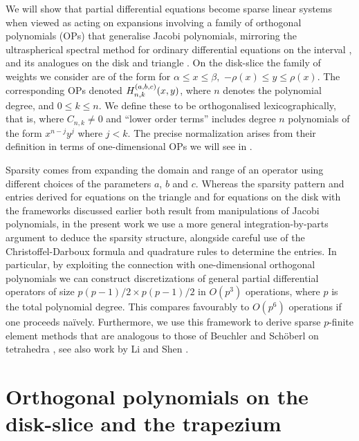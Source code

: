 We will show that partial differential equations become sparse linear systems when viewed as acting on expansions involving a family of orthogonal polynomials (OPs) that generalise Jacobi polynomials, mirroring the ultraspherical spectral method for ordinary differential equations on the interval \cite{olver2013fast}, and its analogues on the disk \cite{vasil2016tensor} and triangle \cite{olver2018recurrence,olver2019triangle}. On the disk-slice the family of weights we consider are of the form 
for $\alpha \leq x \leq \beta,$ $-\rho(x) \leq y \leq \rho(x)$. The corresponding OPs denoted $H_{n,k}^{(a,b,c)}(x,y)$, where $n$ denotes the polynomial degree, and $0 \le k \le n$. We define these to be orthogonalised lexicographically, that is,
where $C_{n,k} \neq 0$ and \enquote{lower order terms} includes degree $n$ polynomials of the form $x^{n-j} y^j$ where $j < k$. The precise normalization arises from their definition in terms of one-dimensional OPs we will see in .

Sparsity comes from expanding the domain and range of an operator using different choices of the parameters $a$, $b$ and $c$. Whereas the sparsity pattern and entries derived for equations on the triangle \cite{olver2018recurrence, olver2019triangle} and for equations on the disk \cite{vasil2016tensor} with the frameworks discussed earlier both result from manipulations of Jacobi polynomials, in the present work we use a more general integration-by-parts argument to deduce the sparsity structure, alongside careful use of the Christoffel-Darboux formula \cite[18.2.2]{DLMF} and quadrature rules to determine the entries. In particular, by exploiting the connection with one-dimensional orthogonal polynomials we can construct discretizations of general partial differential operators of size $p(p-1)/2 \times p(p-1)/2$ in $O(p^3)$ operations, where $p$ is the total polynomial degree. This compares favourably to $O(p^6)$ operations if one proceeds na\"ively. Furthermore, we use this framework to derive sparse $p$-finite element methods that are analogous to those of Beuchler and Sch\"oberl on tetrahedra \cite{beuchler2006new}, see also work by Li and Shen \cite{li2010optimal}.



\section{Orthogonal polynomials on the disk-slice and the trapezium}\label{Section:OPs}

